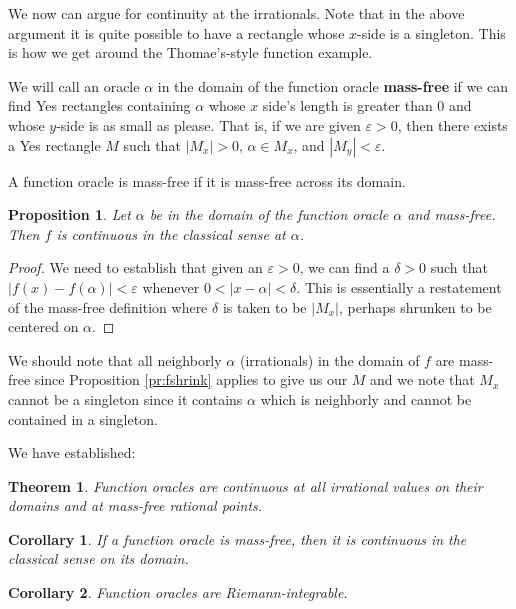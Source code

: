 \documentclass[12pt]{article}
\newtheorem{theorem}{Theorem}
\newtheorem{corollary}{Corollary}
\newtheorem{proposition}{Proposition}
\theoremstyle{remark}
\begin{document}
We now can argue for continuity at the irrationals. Note that in the above argument it is quite possible to have a rectangle whose $x$-side is a singleton. This is how we get around the Thomae's-style function example. 

We will call an oracle $\alpha$ in the domain of the function oracle \textbf{mass-free} if we can find Yes rectangles containing $\alpha$ whose $x$ side's length is greater than 0 and whose $y$-side is as small as please. That is, if we are given $\varepsilon > 0$, then there exists a Yes rectangle $M$ such that $|M_x| > 0$, $\alpha \in M_x$, and $|M_y| < \varepsilon$.
 
 A function oracle is mass-free if it is mass-free across its domain.  

\begin{proposition}
Let $\alpha$ be in the domain of the function oracle $\alpha$ and mass-free. Then $f$ is continuous in the classical sense at $\alpha$.
\end{proposition}

\begin{proof}
    We need to establish that given an $\varepsilon > 0$, we can find a $\delta > 0$ such that $|f(x) - f(\alpha)| < \varepsilon$ whenever $0 < |x - \alpha| < \delta$. This is essentially a restatement of the mass-free definition where $\delta$ is taken to be $|M_x|$, perhaps shrunken to be centered on $\alpha$. 
\end{proof}

We should note that all neighborly $\alpha$ (irrationals) in the domain of $f$ are mass-free since Proposition \ref{pr:fshrink} applies to give us our $M$ and we note that $M_x$ cannot be a singleton since it contains $\alpha$ which is neighborly and cannot be contained in a singleton.

We have established:

\begin{theorem}
    Function oracles are continuous at all irrational values on their domains and at mass-free rational points. 
\end{theorem}

\begin{corollary}
If a function oracle is mass-free, then it is continuous in the classical sense on its domain. 
\end{corollary}

\begin{corollary}
Function oracles are Riemann-integrable. 
\end{corollary}
\end{document}
